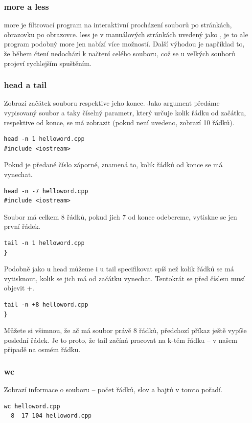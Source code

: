 \documentclass{article}
\begin{document}
\subsubsection{more a less}
more je filtrovací program na interaktivní procházení souborů po stránkách, obrazovku po obrazovce. less je v manuálových stránkách uvedený jako , je to ale program podobný more jen nabízí více možností. Další výhodou je například to, že během čtení nedochází k načtení celého souboru, což se u velkých souborů projeví rychlejším spuštěním.

\subsubsection{head a tail}
Zobrazí začátek souboru respektive jeho konec. Jako argument předáme vypisovaný soubor a taky číselný parametr, který určuje kolik řádku od začátku, respektive od konce, se má zobrazit (pokud není uvedeno, zobrazí 10 řádků).
\begin{verbatim}
head -n 1 helloword.cpp
#include <iostream>
\end{verbatim}
Pokud je předané číslo záporné, znamená to, kolik řádků od konce se má vynechat. 
\begin{verbatim}
head -n -7 helloword.cpp
#include <iostream>
\end{verbatim}
Soubor má celkem 8 řádků, pokud jich 7 od konce odebereme, vytiskne se jen první řádek. 
\begin{verbatim}
tail -n 1 helloword.cpp
}
\end{verbatim}
Podobně jako u head můžeme i u tail specifikovat spíš než kolik řádků se má vytisknout, kolik se jich má od začátku vynechat. Tentokrát se před číslem musí objevit +.

\begin{verbatim}
tail -n +8 helloword.cpp
}
\end{verbatim}
Můžete si všimnou, že ač má soubor právě 8 řádků, předchozí příkaz ještě vypíše poslední řádek. Je to proto, že tail začíná pracovat na k-tém řádku -- v našem případě na osmém řádku.

\subsubsection{wc}
Zobrazí informace o souboru -- počet řádků, slov a bajtů v tomto pořadí.
\begin{verbatim}
wc helloword.cpp
  8  17 104 helloword.cpp
\end{verbatim}
\end{document}

